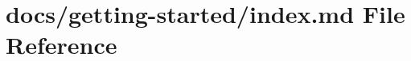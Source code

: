 \hypertarget{getting-started_2index_8md}{}\section{docs/getting-\/started/index.md File Reference}
\label{getting-started_2index_8md}
